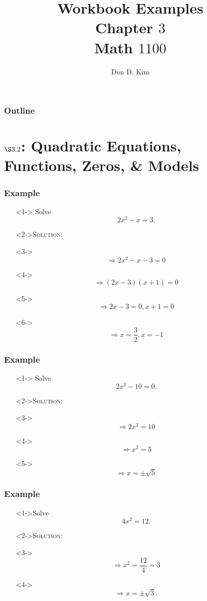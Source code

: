\documentclass[handout]{beamer}
\title{Workbook Examples \\ Chapter $3$ \\ Math $1100$}
\author{Don D. Kim}
\date{\datefmt{\year}{\month}{\day}}
\begin{document}
\begin{frame}
	\titlepage
\end{frame}

\begin{frame}
	\frametitle{Outline}
	\tableofcontents
\end{frame}

\section{$\S 3.2$: Quadratic Equations, Functions, Zeros, \& Models}

\begin{frame}
	\frametitle{Example}
	\begin{enumerate}
		\item[]<1-> Solve \[ 2x^{2}-x=3. \]
		\item[]<2->\textsc{Solution:}
		\item[]<3-> \[ \Rightarrow 2x^{2}-x-3=0 \]
		\item[]<4->\[ \Rightarrow (2x-3)(x+1)=0 \]
		\item[]<5->\[ \Rightarrow 2x-3=0, x+1=0 \]
		\item[]<6->\[ \Rightarrow x=\frac{3}{2}, x=-1\]
	\end{enumerate}
\end{frame}

\begin{frame}
	\frametitle{Example}
	\begin{enumerate}
		\item[]<1-> Solve \[ 2x^{2}-10=0. \]
		\item[]<2->\textsc{Solution:}
		\item[]<3->\[ \Rightarrow 2x^{2}=10\]
		\item[]<4->\[\Rightarrow x^{2}=5\]
		\item[]<5->\[ \Rightarrow x=\pm \sqrt{5} \]
	\end{enumerate}
\end{frame}

\begin{frame}
	\frametitle{Example}
	\begin{enumerate}
		\item[]<1->Solve \[ 4x^{2}=12. \]
		\item[]<2->\textsc{Solution:}
		\item[]<3-> \[ \Rightarrow x^{2}=\frac{12}{4}=3 \]
		\item[]<4->\[ \Rightarrow x=\pm \sqrt{3}. \]
	\end{enumerate}
\end{frame}
\end{document}
